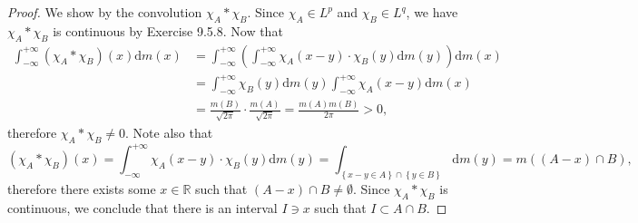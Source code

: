 \begin{proof}
We show by the convolution $\chi_A*\chi_B$. Since $\chi_A\in L^p$ and $\chi_B\in L^q$, we have $\chi_A*\chi_B$ is continuous by Exercise 9.5.8. Now that 
$$
\begin{aligned}
\int_{-\infty}^{+\infty}{\left( \chi _A*\chi _B \right) \left( x \right) \mathrm{d}m\left( x \right)}&=\int_{-\infty}^{+\infty}{\left( \int_{-\infty}^{+\infty}{\chi _A\left( x-y \right) \cdot \chi _B\left( y \right) \mathrm{d}m\left( y \right)} \right) \mathrm{d}m\left( x \right)}
\\
&=\int_{-\infty}^{+\infty}{\chi _B\left( y \right) \mathrm{d}m\left( y \right) \int_{-\infty}^{+\infty}{\chi _A\left( x-y \right) \mathrm{d}m\left( x \right)}}
\\
&=\frac{m\left( B \right)}{\sqrt{2\pi}}\cdot \frac{m\left( A \right)}{\sqrt{2\pi}}=\frac{m\left( A \right) m\left( B \right)}{2\pi}>0,
\end{aligned}
$$
therefore $\chi_A*\chi_B\ne 0$. Note also that 
$$
\left( \chi _A*\chi _B \right) \left( x \right) =\int_{-\infty}^{+\infty}{\chi _A\left( x-y \right) \cdot \chi _B\left( y \right) \mathrm{d}m\left( y \right)}=\int_{\left\{ x-y\in A \right\} \cap \left\{ y\in B \right\}}{\mathrm{d}m\left( y \right)}=m\left( \left( A-x \right) \cap B \right) ,
$$
therefore there exists some $x\in\mathbb{R}$ such that $(A-x)\cap B\ne\emptyset$. Since $\chi_A*\chi_B$ is continuous, we conclude that there is an interval $I\ni x$ such that $I\subset A\cap B$.
\end{proof}